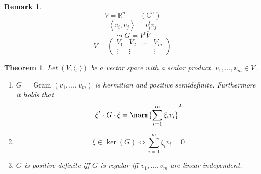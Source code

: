 \documentclass[a4paper,landscape,twocolumn]{article}
\newcommand\functional[1]{\left\langle{#1}\right\rangle}
\newtheorem{theorem}{Theorem}
\newtheorem{rem}{Remark}
\DeclareMathOperator\kernel{ker} %
\DeclarePairedDelimiter\norm\lVert\rVert
\begin{document}
\begin{rem}
  \[ V = \mathbb R^n \qquad (\mathbb C^n) \]
  \[ \functional{v_i, v_j} = v_i^t v_j \]
  \[ \leadsto G = V^t \overline{V} \]
  \[
    V = \begin{pmatrix}
      V_1 & V_2 & \ldots & V_m \\
      \vdots & \vdots &  & \vdots
    \end{pmatrix}
  \]
\end{rem}

\begin{theorem}
  \label{satz-8.53}
  Let $(V, \langle, \rangle)$ be a vector space with a scalar product.
  $v_1, \ldots, v_m \in V$.
  \begin{enumerate}
    \item
      $G = \operatorname{Gram}(v_1, \ldots, v_m)$ is hermitian and positive semidefinite.
      Furthermore it holds that
      \[ \xi^t \cdot G \cdot \overline{\xi} = \norm{\sum_{i=1}^m \xi_i v_i}^2 \]
    \item
      \[ \xi \in \kernel(G) \Leftrightarrow \sum_{i=1}^m \overline{\xi_i} v_i = 0 \]
    \item
      $G$ is positive definite iff $G$ is regular iff $v_1, \ldots, v_m$ are linear independent.
  \end{enumerate}
\end{theorem}
\end{document}
